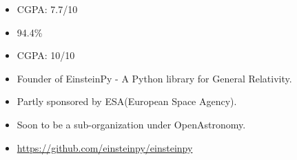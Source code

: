 


\begin{itemize}
    \item CGPA: 7.7/10
\end{itemize}

\divider

\begin{itemize}
    \item 94.4\%
\end{itemize}

\divider

\begin{itemize}
    \item CGPA: 10/10
\end{itemize}

\smallskip
\smallskip









\begin{itemize}
\item Founder of EinsteinPy - A Python library for General Relativity.
\item Partly sponsored by ESA(European Space Agency).
\item Soon to be a sub-organization under OpenAstronomy.
\item \href{https://github.com/einsteinpy/einsteinpy}{https://github.com/einsteinpy/einsteinpy}
\end{itemize}
\smallskip
\smallskip

